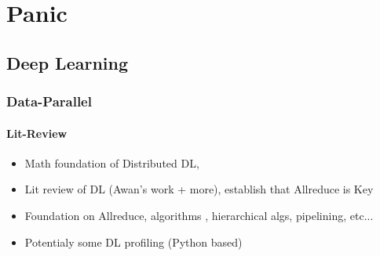 
\chapter[Panic]{Panic}\label{ch:Panic}

\section{Deep Learning}
\subsection{Data-Parallel}
\subsubsection{Lit-Review}

\begin{itemize}
    \item Math foundation of Distributed DL, \cite{Ben-Nun2019DemystifyDL}
    \item Lit review of DL (Awan's work + more), establish that Allreduce is Key
    \item Foundation on Allreduce, algorithms \cite{Thakur2005OptMPICH}, hierarchical algs, pipelining, etc... 
    \item Potentialy some DL profiling (Python based)
\end{itemize}



\clearpage